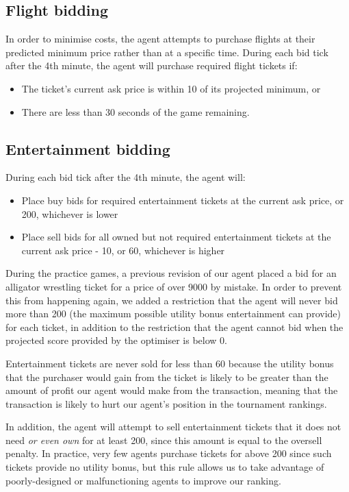 \documentclass[a4paper]{proc}
\begin{document}
\subsection{Flight bidding}

In order to minimise costs, the agent attempts to purchase flights at their predicted minimum price rather than at a specific time. During each bid tick after the 4th minute, the agent will purchase required flight tickets if:

\begin{itemize}
  \item The ticket's current ask price is within 10 of its projected minimum, or
  \item There are less than 30 seconds of the game remaining.
\end{itemize}

\subsection{Entertainment bidding}

During each bid tick after the 4th minute, the agent will:

\begin{itemize}
  \item Place buy bids for required entertainment tickets at the current ask price, or 200, whichever is lower
  \item Place sell bids for all owned but not required entertainment tickets at the current ask price - 10, or 60, whichever is higher
\end{itemize}

During the practice games, a previous revision of our agent placed a bid for an alligator wrestling ticket for a price of over 9000 by mistake. In order to prevent this from happening again, we added a restriction that the agent will never bid more than 200 (the maximum possible utility bonus entertainment can provide) for each ticket, in addition to the restriction that the agent cannot bid when the projected score provided by the optimiser is below 0.

Entertainment tickets are never sold for less than 60 because the utility bonus that the purchaser would gain from the ticket is likely to be greater than the amount of profit our agent would make from the transaction, meaning that the transaction is likely to hurt our agent's position in the tournament rankings.

In addition, the agent will attempt to sell entertainment tickets that it does not need \emph{or even own} for at least 200, since this amount is equal to the oversell penalty. In practice, very few agents purchase tickets for above 200 since such tickets provide no utility bonus, but this rule allows us to take advantage of poorly-designed or malfunctioning agents to improve our ranking.
\end{document}
